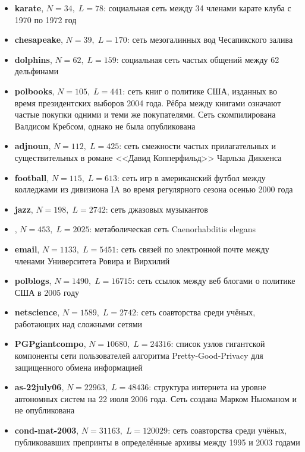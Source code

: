 \begin{itemize}
	
	\item \textbf{karate}, $N = 34,\;L = 78$: социальная сеть между 34 членами карате клуба с 1970 по 1972 год \cite{Zachary:1977}
	\item \textbf{chesapeake}, $N = 39,\;L = 170$: сеть мезогалинных вод Чесапикского залива \cite{Baird&Ulanowicz:1989}
	\item \textbf{dolphins}, $N = 62,\;L = 159$: социальная сеть частых общений между 62 дельфинами \cite{Lusseau&al:2003}
	\item \textbf{polbooks}, $N = 105,\;L = 441$: сеть книг о политике США, изданных во время президентских выборов 2004 года. Рёбра между книгами означают частые покупки одними и теми же покупателями. Сеть скомпилирована Валдисом Кребсом, однако не была опубликована
	\item \textbf{adjnoun}, $N = 112,\;L = 425$: сеть смежности частых прилагательных и существительных в романе <<Давид Копперфильд>> Чарльза Диккенса \cite{Newman:2006}
	\item \textbf{football}, $N = 115,\;L = 613$: сеть игр в американский футбол между колледжами из дивизиона IA во время регулярного сезона осенью 2000 года \cite{Girvan&Newman:2002}
	\item \textbf{jazz}, $N = 198,\;L = 2742$: сеть джазовых музыкантов \cite{Gleiser&Danon:2003}
	\item \textbf{\celegans}, $N = 453,\;L = 2025$: метаболическая сеть Caenorhabditis elegans \cite{Duch&Arenas:2005}
	\item \textbf{email}, $N = 1133,\;L = 5451$: сеть связей по электронной почте между членами Университета Ровира и Вирхилий \cite{Guimera&al:2003}
	\item \textbf{polblogs}, $N = 1490,\;L = 16715$: сеть ссылок между веб блогами о политике США в 2005 году \cite{Adamic&Glance:2005}
	\item \textbf{netscience}, $N = 1589,\;L = 2742$: сеть соавторства среди учёных, работающих над сложными сетями \cite{Newman:2006}
	\item \textbf{PGPgiantcompo}, $N = 10680,\;L = 24316$: список узлов гигантской компоненты сети пользователей алгоритма Pretty-Good-Privacy для защищенного обмена информацией \cite{Boguna&al:2004}
	\item \textbf{as-22july06}, $N = 22963,\;L = 48436$: структура интернета на уровне автономных систем на 22 июля 2006 года. Сеть создана Марком Ньюманом и не опубликована
	\item \textbf{cond-mat-2003}, $N = 31163,\;L = 120029$: сеть соавторства среди учёных, публиковавших препринты в определённые архивы между 1995 и 2003 годами \cite{Newman:2001}

\end{itemize}
